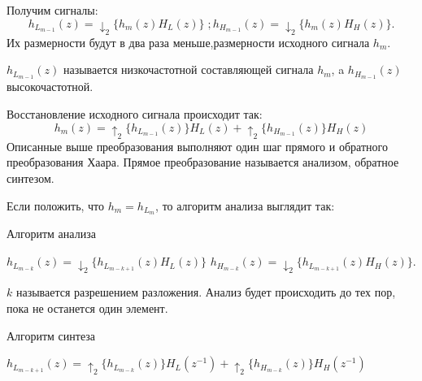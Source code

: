 \documentclass{article}
\begin{document}
Получим сигналы: $$h_{L_{m-1}}(z) = \downarrow_2 \{h_m(z)H_L(z)\}\;; h_{H_{m-1}}(z) = \downarrow_2 \{h_m(z)H_H(z)\}.$$ Их размерности будут в два раза меньше,размерности исходного сигнала $h_m$.

$h_{L_{m-1}}(z)$ называется низкочастотной составляющей сигнала $h_m$, a $h_{H_{m-1}}(z)$ высокочастотной. 

Восстановление исходного сигнала происходит так:
$$h_m(z) = \uparrow_2 \{ h_{L_{m-1}}(z) \} H_L(z) + \uparrow_2 \{ h_{H_{m-1}}(z) \} H_H(z)	$$
Описанные выше преобразования выполняют один шаг прямого и обратного преобразования Хаара. Прямое преобразование называется анализом, обратное синтезом.

Если положить, что $h_m = h_{L_m}$, то алгоритм анализа выглядит так:
\begin{algorithm}
\caption{Алгоритм анализа}
\begin{algorithmic}
	\State $h_{L_{m-k}}(z) = \downarrow_2 \{h_{L_{m-k+1}}(z)H_L(z)\}$
	\State $h_{H_{m-k}}(z) = \downarrow_2 \{h_{L_{m-k+1}}(z)H_H(z)\}.$
	\EndFor
\end{algorithmic}
\end{algorithm}


$k$ называется разрешением разложения. Анализ будет происходить до тех пор, пока не останется один элемент.
\begin{algorithm}[H]
\caption{Алгоритм синтеза}
\begin{algorithmic}
		\State$h_{L_{m-k + 1}}(z) = \uparrow_2 \{ h_{L_{m-k}}(z) \} H_L(z^{-1}) + \uparrow_2 \{ h_{H_{m-k}}(z) \} H_H(z^{-1})$
	\EndFor
\end{algorithmic}
\end{algorithm}	
\end{document}
